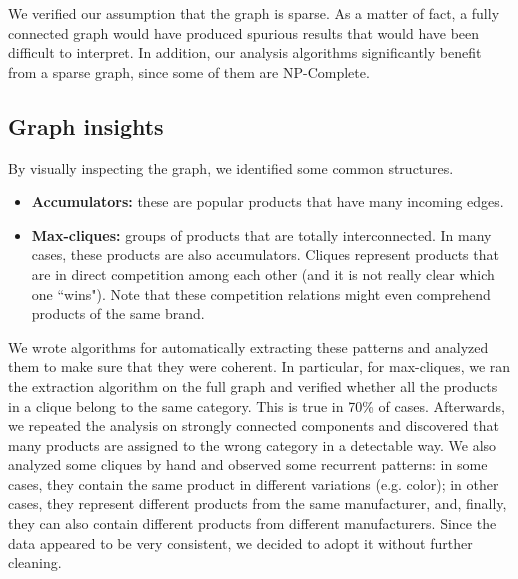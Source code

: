 \documentclass[11pt]{article}
\begin{document}
We verified our assumption that the graph is sparse. As a matter of fact, a fully connected graph would have produced spurious results that would have been difficult to interpret. In addition, our analysis algorithms significantly benefit from a sparse graph, since some of them are NP-Complete.



\subsection{Graph insights}
By visually inspecting the graph, we identified some common structures.
\begin{itemize}
	\item \textbf{Accumulators:} these are popular products that have many incoming edges.
	\item \textbf{Max-cliques:} groups of products that are totally interconnected. In many cases, these products are also accumulators. Cliques represent products that are in direct competition among each other (and it is not really clear which one ``wins"). Note that these competition relations might even comprehend products of the same brand.
\end{itemize}
We wrote algorithms for automatically extracting these patterns and analyzed them to make sure that they were coherent. In particular, for max-cliques, we ran the extraction algorithm on the full graph and verified whether all the products in a clique belong to the same category. This is true in 70\% of cases. Afterwards, we repeated the analysis on strongly connected components and discovered that many products are assigned to the wrong category in a detectable way. We also analyzed some cliques by hand and observed some recurrent patterns: in some cases, they contain the same product in different variations (e.g. color); in other cases, they represent different products from the same manufacturer, and, finally, they can also contain different products from different manufacturers. Since the data appeared to be very consistent, we decided to adopt it without further cleaning.
\end{document}
